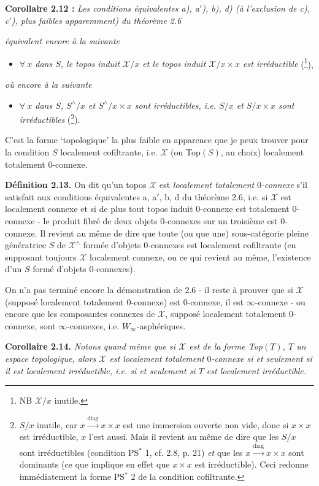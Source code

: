 \documentclass[11pt]{article}
\newcommand{\msp}[1]{\marginpar{\footnotesize [#1]}}
\newcommand{\X}{\mathcal{X}}
\begin{document}
\textbf{Corollaire 2.12 :} \textit{Les conditions équivalentes a), a$'$), b), d) (à l'exclusion de c), c$'$), plus faibles apparemment) du théorème 2.6}

\msp{page 29}\textit{équivalent encore à la suivante}
\begin{itemize}[leftmargin=2.5em]
\item[\textit{e)}] \textit{$\forall\ x$ dans $S$, le topos induit $\X/x$ et le topos induit $\X/x\times x$ est irréductible} (\footnote[37]{NB $\X/x$ inutile.}),
\end{itemize}
\textit{où encore à la suivante} %
\begin{itemize}[leftmargin=2.5em]
\item[\textit{e$'$)}] \textit{$\forall\ x$ dans $S$, $S^\wedge/x$ et $S^\wedge/x{\times}x$ sont irréductibles, i.e. $S/x$ et $S/x{\times}x$ sont irréductibles} (\footnote[38]{$S/x$ inutile, car $x\xrightarrow{\mathrm{diag}}x\times x$ est une immersion ouverte non vide, donc si $x\times x$ est irréductible, $x$ l'est aussi. Mais il revient au même de dire que les $S/x$ sont irréductibles (condition PS$^*$ 1, cf. 2.8, p. 21) \textit{et} que les $x\xrightarrow{\mathrm{diag}}x\times x$ sont dominants (ce que implique en effet que $x\times x$ est irréductible). Ceci redonne immédiatement la forme PS$^*$ 2 de la condition cofiltrante. %
}).
\end{itemize}
C'est la forme `topologique' la plus faible en apparence que je peux trouver pour la condition $S$ localement cofiltrante, i.e. $\X$ (ou Top$(S)$, au choix) localement totalement 0-connexe.

\textbf{Définition 2.13.} On dit qu'un topos $\X$ est \textit{localement totalement} $0$\textit{-connexe} s'il satisfait aux conditions équivalentes a, a$'$, b, d du théorème 2.6, i.e. si $\X$ est localement connexe et si de plus tout topos induit 0-connexe est totalement 0-connexe - le produit fibré de deux objets 0-connexes sur un troisième est 0-connexe. Il revient au même de dire que toute (ou que une) sous-catégorie pleine génératrice $S$ de $\X^\wedge$ formée d'objets 0-connexes est localement cofiltrante (en supposant toujours $\X$ localement connexe, ou ce qui revient au même, l'existence d'un $S$ formé d'objets 0-connexes).

On n'a pas terminé encore la démonstration de 2.6 - il reste à prouver que si $\X$ (supposé localement totalement 0-connexe) est 0-connexe, il est $\infty$-connexe - ou encore que les composantes connexes de $\X$, supposé localement totalement 0-connexe, sont $\infty$-connexes, i.e. $W_\infty$-asphériques.

\msp{page 30}\textbf{Corollaire 2.14.} \textit{Notons quand même que si $\X$ est de la forme Top$(T)$, $T$ un espace topologique, alors $\X$ est localement totalement} $0$\textit{-connexe si et seulement si il est localement irréductible, i.e. si et seulement si $T$ est localement irréductible.}
\end{document}
